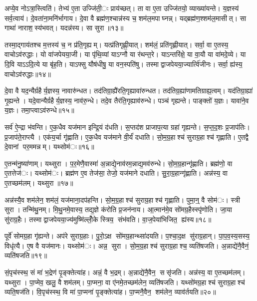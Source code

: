 अप्ये॒व नोऽत्रा॒स्त्विति॑। तेभ्य॑ ए॒ता उज्जि॑ती॒ः प्राय॑च्छत्। ता वा ए॒ता उज्जि॑तयो॒ व्याख्या॑यन्ते। य॒ज्ञस्य॑ सर्व॒त्वाय॑। दे॒वता॑ना॒मनि॑र्भागाय। दे॒वा वै ब्रह्म॑ण॒श्चान्न॑स्य च॒ शम॑ल॒मपाघ्नन्न्। यद्ब्रह्म॑ण॒श्शम॑ल॒मासीत्। सा गाथा॑ नाराश॒स्य॑भवत्। यदन्न॑स्य। सा सुरा॥१३॥

तस्मा॒द्गाय॑तश्च म॒त्तस्य॑ च॒ न प्र॑ति॒गृह्यम्। यत्प्र॑तिगृह्णी॒यात्। शम॑लं॒ प्रति॑गृह्णीयात्। सर्वा॒ वा ए॒तस्य॒ वाचोऽव॑रुद्धाः। यो वा॑जपेयया॒जी। या पृ॑थि॒व्यां याऽग्नौ या र॑थन्त॒रे। याऽन्तरि॑क्षे॒ या वा॒यौ या वा॑मदे॒व्ये। या दि॒वि याऽऽदि॒त्ये या बृ॑ह॒ति। याऽफ्सु यौष॑धीषु॒ या वन॒स्पति॑षु। तस्माद्वाजपेयया॒ज्यार्त्वि॑जीनः। सर्वा॒ ह्य॑स्य॒ वाचोऽव॑रुद्धाः॥१४॥


दे॒वा वै यद॒न्यैर्ग्रहैर्य॒ज्ञस्य॒ नावारु॑न्धत। तद॑तिग्रा॒ह्यै॑रति॒गृह्यावा॑रुन्धत। तद॑तिग्र॒ह्या॑णामतिग्राह्य॒त्वम्। यद॑तिग्रा॒ह्या॑ गृ॒ह्यन्ते। यदे॒वान्यैर्ग्रहैर्य॒ज्ञस्य॒ नाव॑रु॒न्धे। तदे॒व तैर॑ति॒गृह्याव॑रुन्धे। पञ्च॑ गृह्यन्ते। पाङ्क्तो॑ य॒ज्ञः। यावा॑ने॒व य॒ज्ञः। तमा॒प्त्वाऽव॑रुन्धे॥१५॥

सर्व॑ ऐ॒न्द्रा भ॑वन्ति। ए॒क॒धैव यज॑मान इन्द्रि॒यं द॑धति। स॒प्तद॑श प्राजाप॒त्या ग्रहा॑ गृह्यन्ते। स॒प्त॒द॒शः प्र॒जाप॑तिः। प्र॒जाप॑ते॒राप्त्यै। एक॑य॒र्चा गृ॑ह्णाति। ए॒क॒धैव यज॑माने वी॒र्यं॑ दधाति। सो॒म॒ग्र॒हाश्च॑ सुराग्र॒हाश्च॑ गृह्णाति। ए॒तद्वै दे॒वानां पर॒ममन्नम्। यथ्सोम॑ः॥१६॥

ए॒तन्म॑नु॒ष्या॑णाम्। यथ्सुरा। प॒र॒मेणै॒वास्मा॑ अ॒न्नाद्ये॒नाव॑रम॒न्नाद्य॒मव॑रुन्धे। सो॒म॒ग्र॒हान्गृ॑ह्णाति। ब्रह्म॑णो॒ वा ए॒तत्तेज॑ः। यथ्सोम॑ः। ब्रह्म॑ण ए॒व तेज॑सा॒ तेजो॒ यज॑माने दधाति। सु॒रा॒ग्र॒हान्गृ॑ह्णाति। अन्न॑स्य॒ वा ए॒तच्छम॑लम्। यथ्सुरा॥१७॥

अन्न॑स्यै॒व शम॑लेन॒ शम॑लं॒ यज॑माना॒दप॑हन्ति। सो॒म॒ग्र॒हाश्च॑ सुराग्र॒हाश्च॑ गृह्णाति। पुमा॒न्॒ वै सोम॑ः। स्त्री सुरा। तन्मि॑थु॒नम्। मि॒थु॒नमे॒वास्य॒ तद्य॒ज्ञे क॑रोति प्र॒जन॑नाय। आ॒त्मान॑मे॒व सो॑मग्र॒हैस्स्पृ॑णोति। जा॒या सु॑राग्र॒हैः। तस्माद्वाजपेयया॒ज्य॑मुष्मि॑ल्लोँ॒के स्त्रिय॒ संभ॑वति। वा॒ज॒पेया॑भिजित॒ ह्य॑स्य॥१८॥

पूर्वे॑ सोमग्र॒हा गृ॑ह्यन्ते। अप॑रे सुराग्र॒हाः। पु॒रो॒ऽक्ष सो॑मग्र॒हान्थ्सा॑दयति। प॒श्चा॒द॒क्ष सु॑राग्र॒हान्। पा॒प॒व॒स्य॒सस्य॒ विधृ॑त्यै। ए॒ष वै यज॑मानः। यथ्सोम॑ः। अन्न॒ सुरा। सो॒म॒ग्र॒हाश्च॑ सुराग्र॒हाश्च॒ व्यति॑षजति। अ॒न्नाद्ये॑नै॒वैनं॒ व्यति॑षजति॥१९॥

सं॒पृच॑स्स्थ॒ सं मा॑ भ॒द्रेण॑ पृ॒ङ्क्तेत्या॑ह। अन्नं॒ वै भ॒द्रम्। अ॒न्नाद्ये॑नै॒वैन॒ ससृ॑जति। अन्न॑स्य॒ वा ए॒तच्छम॑लम्। यथ्सुरा। पा॒प्मेव॒ खलु॒ वै शम॑लम्। पा॒प्मना॒ वा ए॑नमे॒तच्छम॑लेन॒ व्यति॑षजति। यथ्सो॑मग्र॒हाश्च॑ सुराग्र॒हाश्च॑ व्यति॒षज॑ति। वि॒पृच॑स्स्थ॒ वि मा॑ पा॒प्मना॑ पृ॒ङ्क्तेत्या॑ह। पा॒प्मनै॒वैन॒ शम॑लेन॒ व्याव॑र्तयति॥२०॥

